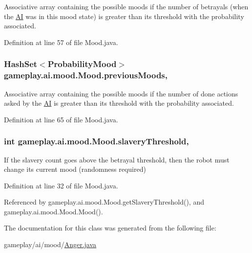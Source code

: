 Associative array containing the possible moods if the number of betrayals (when the \hyperlink{a00001}{A\-I} was in this mood state) is greater than its threshold with the probability associated. 



Definition at line 57 of file Mood.\-java.

\hypertarget{a00015_a5c8758b18bb740a2fd1edf8d57a5ab27}{
\subsubsection[{previous\-Moods}]{\setlength{\rightskip}{0pt plus 5cm}Hash\-Set$<${\bf Probability\-Mood}$>$ gameplay.\-ai.\-mood.\-Mood.\-previous\-Moods\hspace{0.3cm}{\ttfamily [protected]}, {\ttfamily [inherited]}}}\label{a00015_a5c8758b18bb740a2fd1edf8d57a5ab27}


Associative array containing the possible moods if the number of done actions asked by the \hyperlink{a00001}{A\-I} is greater than its threshold with the probability associated. 



Definition at line 65 of file Mood.\-java.

\hypertarget{a00015_a12c9abed7c077f9013956cda08e41619}{
\subsubsection[{slavery\-Threshold}]{\setlength{\rightskip}{0pt plus 5cm}int gameplay.\-ai.\-mood.\-Mood.\-slavery\-Threshold\hspace{0.3cm}{\ttfamily [protected]}, {\ttfamily [inherited]}}}\label{a00015_a12c9abed7c077f9013956cda08e41619}


If the slavery count goes above the betrayal threshold, then the robot must change its current mood (randomness required) 



Definition at line 32 of file Mood.\-java.



Referenced by gameplay.\-ai.\-mood.\-Mood.\-get\-Slavery\-Threshold(), and gameplay.\-ai.\-mood.\-Mood.\-Mood().



The documentation for this class was generated from the following file\-:\begin{DoxyCompactItemize}
\item 
gameplay/ai/mood/\hyperlink{a00044}{Anger.\-java}\end{DoxyCompactItemize}
